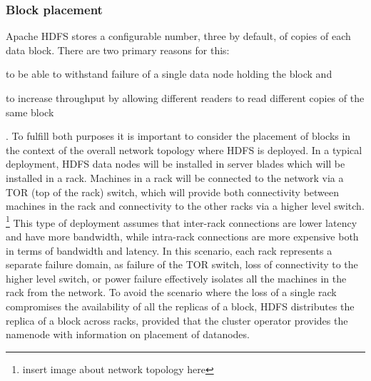 \subsubsection{Block placement}
\label{sec:block-placement}
Apache HDFS stores a configurable number, three by default, of copies of each data block.
There are two primary reasons for this:
\begin{inparaenum}[i)]
\item to be able to withstand failure of a single data node holding the block and
\item to increase throughput by allowing different readers to read different copies of the same block
\end{inparaenum}.
To fulfill both purposes it is important to consider the placement of blocks in the context of the overall network topology where HDFS is deployed.
In a typical deployment, HDFS data nodes will be installed in server blades which will be installed in a rack.
Machines in a rack will be connected to the network via a TOR (top of the rack) switch, which will provide both connectivity between machines in the rack and connectivity to the other racks via a higher level switch. \footnote{insert image about network topology here} 
This type of deployment assumes that inter-rack connections are lower latency and have more bandwidth, while intra-rack connections are more expensive both in terms of bandwidth and latency.
In this scenario, each rack represents a separate failure domain, as failure of the TOR switch, loss of connectivity to the higher level switch, or power failure effectively isolates all the machines in the rack from the network.
To avoid the scenario where the loss of a single rack compromises the availability of all the replicas of a block, HDFS distributes the replica of a block across racks, provided that the cluster operator provides the namenode with information on placement of datanodes.

